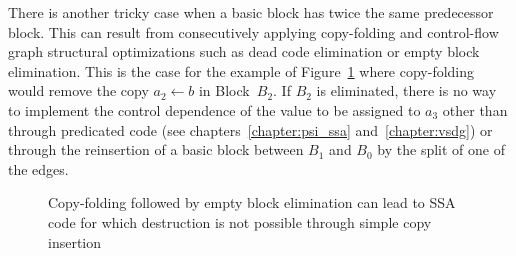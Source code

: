 There is another tricky case when a basic block has twice the same predecessor block. 
This can result from consecutively applying copy-folding and control-flow graph structural optimizations such as dead code elimination or empty block elimination. 
This is the case for the example of Figure~\ref{fig:alternative_ssa_destruction:doublepreds} where copy-folding would remove the copy $a_2\gets b$ in Block~$B_2$. 
If $B_2$ is eliminated, there is no way to implement the control dependence of the value to be assigned to $a_3$ other than through predicated code (see chapters~\ref{chapter:psi_ssa} and~\ref{chapter:vsdg}) or through the reinsertion of a basic block between $B_1$ and $B_0$ by the split of one of the edges.

\begin{figure}[h]
\hfill
{}\hfill
{}\caption{\label{fig:alternative_ssa_destruction:doublepreds} Copy-folding followed by empty block elimination can lead to SSA code for which destruction is not possible through simple copy insertion}
\end{figure}


